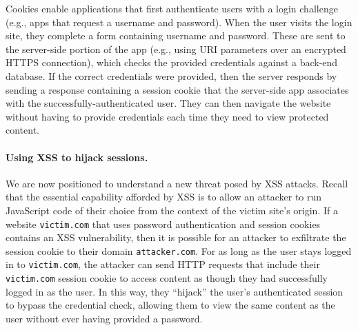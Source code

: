 \documentclass[11pt,twoside]{scrartcl}
\begin{document}
Cookies enable applications that first authenticate users with a login challenge (e.g., apps that request a username and password). When the user visits the login site, they complete a form containing username and password. These are sent to the server-side portion of the app (e.g., using URI parameters over an encrypted HTTPS connection), which checks the provided credentials against a back-end database. If the correct credentials were provided, then the server responds by sending a response containing a session cookie that the server-side app associates with the successfully-authenticated user. They can then navigate the website without having to provide credentials each time they need to view protected content.

\paragraph{Using XSS to hijack sessions.} We are now positioned to understand a new threat posed by XSS attacks. Recall that the essential capability afforded by XSS is to allow an attacker to run JavaScript code of their choice from the context of the victim site's origin. If a website \verb'victim.com' that uses password authentication and session cookies contains an XSS vulnerability, then it is possible for an attacker to exfiltrate the session cookie to their domain \verb'attacker.com'. For as long as the user stays logged in to \verb'victim.com', the attacker can send HTTP requests that include their \verb'victim.com' session cookie to access content as though they had successfully logged in as the user. In this way, they ``hijack'' the user's authenticated session to bypass the credential check, allowing them to view the same content as the user without ever having provided a password.
\end{document}
